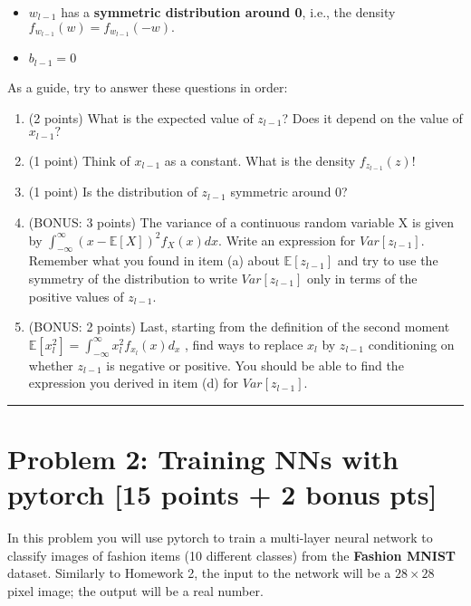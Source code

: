\documentclass[
  letterpaper,
  DIV=11,
  numbers=noendperiod]{scrartcl}
\providecommand{\tightlist}{%
  \setlength{\itemsep}{0pt}\setlength{\parskip}{0pt}}\usepackage{longtable,booktabs,array}
\begin{document}
\begin{itemize}
\tightlist
\item
  \(w_{l-1}\) has a \textbf{symmetric distribution around 0}, i.e., the
  density \(f_{w_{l-1}}(w)=f_{w_{l-1}}(-w).\)
\item
  \(b_{l-1}=0\)
\end{itemize}

As a guide, try to answer these questions in order:

\begin{enumerate}
\def\labelenumi{(\alph{enumi})}
\item
  (2 points) What is the expected value of \({z_{l-1}}\)? Does it depend
  on the value of \({x_{l-1}}?\)
\item
  (1 point) Think of \(x_{l-1}\) as a constant. What is the density
  \(f_{z_{l-1}}(z)!\)
\item
  (1 point) Is the distribution of \(z_{l-1}\) symmetric around 0?
\item
  (BONUS: 3 points) The variance of a continuous random variable X is
  given by \(\int_{-\infty}^{\infty}(x-\mathbb{E}[X])^{2}f_{X}(x)dx.\)
  Write an expression for \(Var[z_{l-1}]\). Remember what you found in
  item (a) about \(\mathbb{E}[z_{l-1}]\) and try to use the symmetry of
  the distribution to write \(Var[z_{l-1}]\) only in terms of the
  positive values of \(z_{l-1}\).
\item
  (BONUS: 2 points) Last, starting from the definition of the second
  moment
  \(\mathbb{E}[x_{l}^{2}]=\int_{-\infty}^{\infty}x_{l}^{2}f_{x_{l}}(x)d_{x}\)
  , find ways to replace \(x_{l}\) by \(z_{l-1}\) conditioning on
  whether \(z_{l-1}\) is negative or positive. You should be able to
  find the expression you derived in item (d) for \(Var[z_{l-1}]\).
\end{enumerate}

\begin{center}\rule{0.5\linewidth}{0.5pt}\end{center}

\section{Problem 2: Training NNs with pytorch {[}15 points + 2 bonus
pts{]}}\label{problem-2-training-nns-with-pytorch-15-points-2-bonus-pts}

In this problem you will use pytorch to train a multi-layer neural
network to classify images of fashion items (10 different classes) from
the \textbf{Fashion MNIST} dataset. Similarly to Homework 2, the input
to the network will be a \(28\times28\) pixel image; the output will be
a real number.
\end{document}
